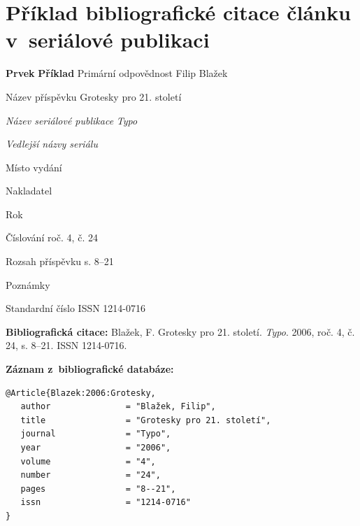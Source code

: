 \newpage
\section*{Příklad bibliografické citace článku v~seriálové publikaci}
\label{pr-casopis-clanek}
\begin{tabbing} 
\zarazky
\textbf{Prvek} \> \textbf{Příklad} \odradkovani
Primární odpovědnost \>
Filip {\sc Blažek}

\odradkovani
Název příspěvku \>
Grotesky pro 21. století

\odradkovani
{\em Název seriálové publikace} \>
{\em Typo}

\odradkovani
{\em Vedlejší názvy seriálu}\footnotemark[1] \>

\odradkovani
Místo vydání\footnotemark[1] \>

\odradkovani 
Nakladatel\footnotemark[1] \>

\odradkovani
Rok 

\odradkovani
Číslování \>
roč. 4, č. 24

\odradkovani
Rozsah příspěvku \>
s. 8--21

\odradkovani
Poznámky\footnotemark[2] \>

\odradkovani
Standardní číslo \>
ISSN 1214-0716
\odradkovani
\end{tabbing}

\noindent \textbf{Bibliografická citace:} \odradkovani
{\sc Blažek}, F. Grotesky pro 21. století. {\em Typo}. 2006, roč. 4, č. 24,
s. 8--21. ISSN 1214-0716.

\bigskip \bigskip
\noindent \textbf{Záznam z~bibliografické databáze:}
\vspace{-0.5em}
\begin{verbatim}
@Article{Blazek:2006:Grotesky,
   author               = "Blažek, Filip",
   title                = "Grotesky pro 21. století",
   journal              = "Typo",
   year                 = "2006",
   volume               = "4",
   number               = "24",
   pages                = "8--21",
   issn                 = "1214-0716"
}
\end{verbatim}


\newpage

